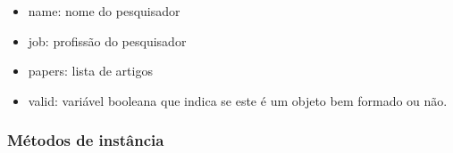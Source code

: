 \begin{itemize}
  \item name: nome do pesquisador

  \item job: profissão do pesquisador

  \item papers: lista de artigos

  \item valid: variável booleana que indica se este é um objeto bem formado ou não.

\end{itemize}

\subsubsection{Métodos de instância}

